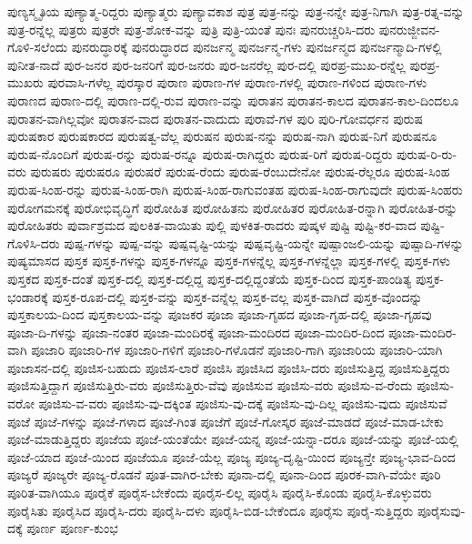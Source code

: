 {ಪುಣ್ಯಸ್ಮೃತಿಯ
ಪುಣ್ಯಾತ್ಮ-ರಿದ್ದರು
ಪುಣ್ಯಾತ್ಮರು
ಪುಣ್ಯಾವಕಾಶ
ಪುತ್ರ
ಪುತ್ರ-ನನ್ನು
ಪುತ್ರ-ನನ್ನೇ
ಪುತ್ರ-ನಿಗಾಗಿ
ಪುತ್ರ-ರತ್ನ-ವನ್ನು
ಪುತ್ರ-ರನ್ನೆಲ್ಲ
ಪುತ್ರರು
ಪುತ್ರರೇ
ಪುತ್ರ-ಶೋಕ-ವನ್ನು
ಪುತ್ರಿ
ಪುತ್ರಿ-ಯಂತೆ
ಪುನಃ
ಪುನರುಚ್ಚರಿಸಿ-ದರು
ಪುನರುಜ್ಜೀವನ-ಗೊಳಿ-ಸಲೆಂದು
ಪುನರುದ್ಧಾರಕ್ಕೆ
ಪುನರುದ್ಧಾರದ
ಪುನರ್ಜನ್ಮ
ಪುನರ್ಜನ್ಮ-ಗಳು
ಪುನರ್ಜನ್ಮದ
ಪುನರ್ಜನ್ಮಾದಿ-ಗಳಲ್ಲಿ
ಪುನೀತ-ನಾದೆ
ಪುರ-ಜನರ
ಪುರ-ಜನರಿಗೆ
ಪುರ-ಜನರು
ಪುರ-ಜನರೆಲ್ಲ
ಪುರ-ದಲ್ಲಿ
ಪುರಪ್ರ-ಮುಖ-ರನ್ನೆಲ್ಲ
ಪುರಪ್ರ-ಮುಖರು
ಪುರವಾಸಿ-ಗಳೆಲ್ಲ
ಪುರಸ್ಕಾರ
ಪುರಾಣ
ಪುರಾಣ-ಗಳ
ಪುರಾಣ-ಗಳಲ್ಲಿ
ಪುರಾಣ-ಗಳಿಂದ
ಪುರಾಣ-ಗಳು
ಪುರಾಣದ
ಪುರಾಣ-ದಲ್ಲಿ
ಪುರಾಣ-ದಲ್ಲಿ-ರುವ
ಪುರಾಣ-ವನ್ನು
ಪುರಾತನ
ಪುರಾತನ-ಕಾಲದ
ಪುರಾತನ-ಕಾಲ-ದಿಂದಲೂ
ಪುರಾತನ-ವಾಗಿಲ್ಲವೋ
ಪುರಾತನ-ವಾದ
ಪುರಾತನ-ವಾದುದು
ಪುರಾವೆ-ಗಳ
ಪುರಿ
ಪುರಿ-ಗೋವರ್ಧನ
ಪುರುಷ
ಪುರುಷಕಾರ
ಪುರುಷಕಾರದ
ಪುರುಷತ್ವ-ವೆಲ್ಲ
ಪುರುಷನ
ಪುರುಷ-ನನ್ನು
ಪುರುಷ-ನಾಗಿ
ಪುರುಷ-ನಿಗೆ
ಪುರುಷನೂ
ಪುರುಷ-ನೊಂದಿಗೆ
ಪುರುಷ-ರನ್ನು
ಪುರುಷ-ರನ್ನೂ
ಪುರುಷ-ರಾಗಿದ್ದರು
ಪುರುಷ-ರಿಗೆ
ಪುರುಷ-ರಿದ್ದರು
ಪುರುಷ-ರಿ-ರು-ವರು
ಪುರುಷರು
ಪುರುಷರೂ
ಪುರುಷರೆ
ಪುರುಷ-ರೆಂದು
ಪುರುಷ-ರೆಂಬುದೇನೋ
ಪುರುಷ-ರೆಲ್ಲರೂ
ಪುರುಷ-ಸಿಂಹ
ಪುರುಷ-ಸಿಂಹ-ರನ್ನು
ಪುರುಷ-ಸಿಂಹ-ರಾಗಿ
ಪುರುಷ-ಸಿಂಹ-ರಾಗುವಂತಹ
ಪುರುಷ-ಸಿಂಹ-ರಾಗುವುದೇ
ಪುರುಷ-ಸಿಂಹರು
ಪುರೋಗಮನಕ್ಕೆ
ಪುರೋಭಿವೃದ್ಧಿಗೆ
ಪುರೋಹಿತ
ಪುರೋಹಿತನು
ಪುರೋಹಿತರ
ಪುರೋಹಿತ-ರನ್ನಾಗಿ
ಪುರೋಹಿತ-ರನ್ನು
ಪುರೋಹಿತರು
ಪುರ್ವಾಶ್ರಮದ
ಪುಲಕಿತ-ವಾಯಿತು
ಪುಲ್ಲಿ
ಪುಳಕಿತ-ರಾದರು
ಪುಷ್ಕಳ
ಪುಷ್ಟಿ
ಪುಷ್ಟಿ-ಕರ-ವಾದ
ಪುಷ್ಟಿ-ಗೊಳಿಸಿ-ದರು
ಪುಷ್ಪ-ಗಳನ್ನು
ಪುಷ್ಪ-ವನ್ನು
ಪುಷ್ಪವೃಷ್ಟಿ-ಯನ್ನು
ಪುಷ್ಪವೃಷ್ಟಿ-ಯನ್ನೇ
ಪುಷ್ಪಾಂಜಲಿ-ಯನ್ನು
ಪುಷ್ಪಾದಿ-ಗಳನ್ನು
ಪುಷ್ಯಮಾಸದ
ಪುಸ್ತಕ
ಪುಸ್ತಕ-ಗಳನ್ನು
ಪುಸ್ತಕ-ಗಳನ್ನೂ
ಪುಸ್ತಕ-ಗಳನ್ನೆಲ್ಲ
ಪುಸ್ತಕ-ಗಳನ್ನೆಲ್ಲಾ
ಪುಸ್ತಕ-ಗಳಲ್ಲಿ
ಪುಸ್ತಕ-ಗಳು
ಪುಸ್ತಕದ
ಪುಸ್ತಕ-ದಂತೆ
ಪುಸ್ತಕ-ದಲ್ಲಿ
ಪುಸ್ತಕ-ದಲ್ಲಿದ್ದ
ಪುಸ್ತಕ-ದಲ್ಲಿದ್ದಂತೆಯೆ
ಪುಸ್ತಕ-ದಿಂದ
ಪುಸ್ತಕ-ಪಾಂಡಿತ್ಯ
ಪುಸ್ತಕ-ಭಂಡಾರಕ್ಕೆ
ಪುಸ್ತಕ-ರೂಪ-ದಲ್ಲಿ
ಪುಸ್ತಕ-ವನ್ನು
ಪುಸ್ತಕ-ವನ್ನೆಲ್ಲ
ಪುಸ್ತಕ-ವಲ್ಲ
ಪುಸ್ತಕ-ವಾಗಿದೆ
ಪುಸ್ತಕ-ವೊಂದನ್ನು
ಪುಸ್ತಕಾಲಯ-ದಿಂದ
ಪುಸ್ತಕಾಲಯ-ವನ್ನು
ಪೂಜಕರ
ಪೂಜಾ
ಪೂಜಾ-ಗೃಹದ
ಪೂಜಾ-ಗೃಹ-ದಲ್ಲಿ
ಪೂಜಾ-ಗೃಹವು
ಪೂಜಾ-ದಿ-ಗಳನ್ನು
ಪೂಜಾ-ನಂತರ
ಪೂಜಾ-ಮಂದಿರಕ್ಕೆ
ಪೂಜಾ-ಮಂದಿರದ
ಪೂಜಾ-ಮಂದಿರ-ದಿಂದ
ಪೂಜಾ-ಮಂದಿರ-ವಾಗಿ
ಪೂಜಾರಿ
ಪೂಜಾರಿ-ಗಳ
ಪೂಜಾರಿ-ಗಳಿಗೆ
ಪೂಜಾರಿ-ಗಳೊಡನೆ
ಪೂಜಾರಿ-ಗಾಗಿ
ಪೂಜಾರಿಯ
ಪೂಜಾರಿ-ಯಾಗಿ
ಪೂಜಾಸನ-ದಲ್ಲಿ
ಪೂಜಿಸ-ಬಹುದು
ಪೂಜಿಸ-ಲಾರೆ
ಪೂಜಿಸಿ
ಪೂಜಿಸಿದ
ಪೂಜಿಸಿ-ದರು
ಪೂಜಿಸುತ್ತಿದ್ದ
ಪೂಜಿಸುತ್ತಿದ್ದರು
ಪೂಜಿಸುತ್ತಿದ್ದಾಗ
ಪೂಜಿಸುತ್ತಿರು-ವರು
ಪೂಜಿಸುತ್ತಿರು-ವೆವು
ಪೂಜಿಸುವ
ಪೂಜಿಸು-ವರು
ಪೂಜಿಸು-ವ-ರೆಂದು
ಪೂಜಿಸು-ವರೋ
ಪೂಜಿಸು-ವ-ವರು
ಪೂಜಿಸು-ವು-ದಕ್ಕಿಂತ
ಪೂಜಿಸು-ವು-ದಕ್ಕೆ
ಪೂಜಿಸು-ವು-ದಿಲ್ಲ
ಪೂಜಿಸು-ವುದು
ಪೂಜಿಸುವೆ
ಪೂಜೆ
ಪೂಜೆ-ಗಳನ್ನು
ಪೂಜೆ-ಗಳಾದ
ಪೂಜೆ-ಗಿಂತ
ಪೂಜೆಗೆ
ಪೂಜೆ-ಗೋಸ್ಕರ
ಪೂಜೆ-ಮಾಡದೆ
ಪೂಜೆ-ಮಾಡ-ಬೇಕು
ಪೂಜೆ-ಮಾಡುತ್ತಿದ್ದರು
ಪೂಜೆಯ
ಪೂಜೆ-ಯಂತೆಯೇ
ಪೂಜೆ-ಯನ್ನ
ಪೂಜೆ-ಯನ್ನಾ-ದರೂ
ಪೂಜೆ-ಯನ್ನು
ಪೂಜೆ-ಯಲ್ಲಿ
ಪೂಜೆ-ಯಾದ
ಪೂಜೆ-ಯಿಂದ
ಪೂಜೆಯೂ
ಪೂಜೆ-ಯೆಲ್ಲ
ಪೂಜ್ಯ
ಪೂಜ್ಯ-ದೃಷ್ಟಿ-ಯಿಂದ
ಪೂಜ್ಯನ್ತೇ
ಪೂಜ್ಯ-ಭಾವ-ದಿಂದ
ಪೂಜ್ಯರೆ
ಪೂಜ್ಯರೇ
ಪೂಜ್ಯ-ರೊಡನೆ
ಪೂತ-ವಾಗಿರ-ಬೇಕು
ಪೂನಾ-ದಲ್ಲಿ
ಪೂನಾ-ದಿಂದ
ಪೂರಕ-ವಾಗಿ-ವೆಯೇ
ಪೂರಿ
ಪೂರಿತ-ವಾಗಿಯೂ
ಪೂರೈಕೆ
ಪೂರೈಸ-ಬೇಕೆಂದು
ಪೂರೈಸ-ಲಿಲ್ಲ
ಪೂರೈಸಿ
ಪೂರೈಸಿ-ಕೊಂಡು
ಪೂರೈಸಿ-ಕೊಳ್ಳುವರು
ಪೂರೈಸಿತು
ಪೂರೈಸಿದ
ಪೂರೈಸಿ-ದರು
ಪೂರೈಸಿ-ದಳು
ಪೂರೈಸಿ-ಬಿಡ-ಬೇಕೆಂದೂ
ಪೂರೈಸು
ಪೂರೈ-ಸುತ್ತಿದ್ದರು
ಪೂರೈಸುವು-ದಕ್ಕೆ
ಪೂರ್ಣ
ಪೂರ್ಣ-ಕುಂಭ
}
